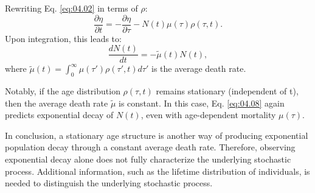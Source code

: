 Rewriting Eq. \eqref{eq:04.02} in terms of $\rho$:
\begin{equation*}
\frac{\partial\eta}{\partial t} = -\frac{\partial\eta}{\partial\tau} - N(t)\mu(\tau)\rho(\tau,t).
\end{equation*}
Upon integration, this leads to:
\begin{equation}
\frac{dN(t)}{dt} = -\widetilde{\mu}(t)N(t), \label{eq:04.08}
\end{equation}
where $\widetilde{\mu}(t) = \int_0^\infty \mu(\tau')\rho(\tau',t)d\tau'$ is the average death rate.

Notably, if the age distribution $\rho(\tau,t)$ remains stationary (independent of t), then the average death rate $\widetilde{\mu}$ is constant. In this case, Eq. \eqref{eq:04.08} again predicts exponential decay of $N(t)$, even with age-dependent mortality $\mu(\tau)$.

In conclusion, a stationary age structure is another way of producing exponential population decay through a constant average death rate. Therefore, observing exponential decay alone does not fully characterize the underlying stochastic process. Additional information, such as the lifetime distribution of individuals, is needed to distinguish the underlying stochastic process.